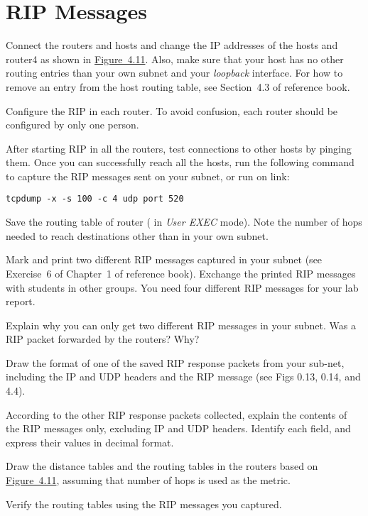 \documentclass{../UTNetLab}
\begin{document}
\section{RIP Messages}
    Connect the routers and hosts and change the IP addresses of the hosts and router4 as shown in \hyperref[fig:4.11]{Figure~4.11}.
    Also, make sure that your host has no other routing entries than your own subnet and your \textit{loopback} interface.
    For how to remove an entry from the host routing table, see Section~4.3 of reference book.

    Configure the RIP in each router.
    To avoid confusion, each router should be configured by only one person.

    After starting RIP in all the routers, test connections to other hosts by pinging them.
    Once you can successfully reach all the hosts, run the following command to capture the RIP messages sent on your subnet, or run  on link:
    \begin{lstlisting}[morekeywords={[3]udp,port}]
tcpdump -x -s 100 -c 4 udp port 520
    \end{lstlisting}

    Save the routing table of router ( in \textit{User EXEC} mode).
    Note the number of hops needed to reach destinations other than in your own subnet.

    Mark and print two different RIP messages captured in your subnet (see Exercise~6 of Chapter~1 of reference book).
    Exchange the printed RIP messages with students in other groups.
    You need four different RIP messages for your lab report.
    
    \begin{report}
        \item Explain why you can only get two different RIP messages in your subnet.
        Was a RIP packet forwarded by the routers?
        Why?
        
        \item Draw the format of one of the saved RIP response packets from your sub-net, including the IP and UDP headers and the RIP message (see Figs 0.13, 0.14, and 4.4).
        
        \item According to the other RIP response packets collected, explain the contents of the RIP messages only, excluding IP and UDP headers.
        Identify each field, and express their values in decimal format.

        
        \item Draw the distance tables and the routing tables in the routers based on \hyperref[fig:4.11]{Figure~4.11}, assuming that number of hops is used as the metric.

        \item Verify the routing tables using the RIP messages you captured.
    \end{report}
\end{document}
